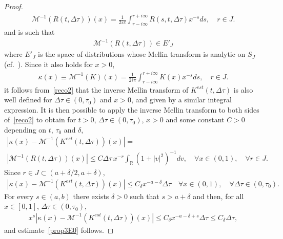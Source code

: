 \documentclass[10pt]{amsart}
\theoremstyle{definition}\newtheorem{defi}[theo]{Definition}\newtheorem{rema}[theo]{Remark}\newtheorem{exam}[theo]{Example}\newtheorem{exem}[theo]{Example}\newtheorem{nota}[theo]{Notation}
\newcommand*\R{\mathbb{R}}
\newcommand*\M{\mathcal{M}}
\let\oldforall\forall
\renewcommand*{\forall}{\mathrel{\oldforall}}
\begin{document}
\begin{proof}
\begin{align*}
\M^{-1}(R(t, \Delta \tau))(x)=\frac {1} {2i\pi }\int _{ r-i\infty }^{r+i\infty} R(s, t, \Delta \tau)x^{-s}ds,\quad r\in J.
\end{align*}
and is such that
\begin{align*}
\M^{-1}(R(t, \Delta \tau))\in E'_{ J }
\end{align*}
where $ E' _{ J }$ is the space of distributions whose Mellin transform is analytic on $S_J$ (cf.~\cite{ML}). Since it also holds for $x>0$,
\begin{align*}
\kappa (x)\equiv\M^{-1}(K)(x)= \frac {1} {2i\pi }\int _{ r-i\infty }^{r+i\infty} K(x) x^{-s}ds,\quad r\in J.
\end{align*}
it follows from~\eqref{reco2} that the inverse Mellin transform of $K^{est}(t, \Delta \tau)$ is also well defined for $\Delta \tau \in (0, \tau _0)$ and $x>0$, and given by a similar integral expression. It is then possible to apply the inverse Mellin transform to both sides of~\eqref{reco2} to obtain for $t>0$, $\Delta \tau \in (0, \tau _0)$, $x>0$ and some constant $C>0$ depending on $t$, $\tau _0$ and $\delta $,
\begin{multline*}
\left|\kappa (x) -\M^{-1}\left(K^{est}(t, \Delta \tau)\right)(x)\right|=\\
\left|\M^{-1}(R(t, \Delta \tau))(x)\right|\le C\Delta \tau\, x^{-r}\int _{\R} \left(1+|v|^2\right)^{-1}dv,\quad\forall x\in (0, 1),\quad\forall r\in J.
\end{multline*}
Since $r\in J\subset (a+\delta/2, a+\delta)$,
\begin{align*}
\left|\kappa (x)-\M^{-1}\left(K^{est}(t, \Delta \tau) \right)(x)\right|\le C_\delta x^{-a-\delta} \Delta \tau\quad\forall x\in (0, 1),\quad\forall \Delta \tau\in (0, \tau _0).
\end{align*}
For every $s\in (a, b)$ there exists $\delta >0$ such that $s>a+\delta $ and then, for all $x\in [0, 1]$, $\Delta \tau\in (0, \tau _0)$,
\begin{align*}
x^s\left|\kappa (x)-\M^{-1}\left(K^{est}(t, \Delta \tau) \right)(x)\right|\le C_\delta x^{-a-\delta+s } \Delta \tau\le C_\delta \Delta \tau,
\end{align*}
and estimate~\eqref{prop3E0} follows.
\end{proof}
\end{document}
